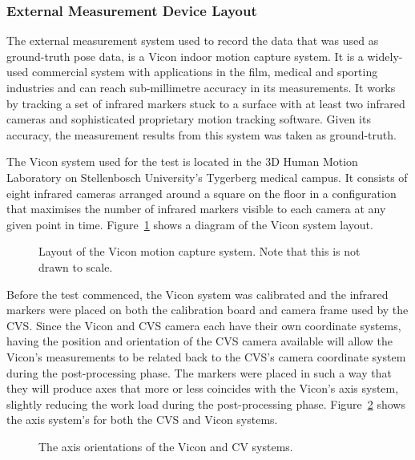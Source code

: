 \subsubsection{External Measurement Device Layout}

The external measurement system used to record the data that was used as ground-truth pose data, is a Vicon indoor motion capture system. It is a widely-used commercial system with applications in the film, medical and sporting industries and can reach sub-millimetre accuracy in its measurements. It works by tracking a set of infrared markers stuck to a surface with at least two infrared cameras and sophisticated proprietary motion tracking software. Given its accuracy, the measurement results from this system was taken as ground-truth.

The Vicon system used for the test is located in the 3D Human Motion Laboratory on Stellenbosch University's Tygerberg medical campus. It consists of eight infrared cameras arranged around a square on the floor in a configuration that maximises the number of infrared markers visible to each camera at any given point in time. Figure~\ref{fig:vicon-layout} shows a diagram of the Vicon system layout. 
 
\begin{figure}
  \centering
  \def\svgwidth{0.6\textwidth}
  
  \caption[Layout of the Vicon motion capture system.]{Layout of the Vicon motion capture system. Note that this is not drawn to scale.}
\label{fig:vicon-layout}
\end{figure}

Before the test commenced, the Vicon system was calibrated and the infrared markers were placed on both the calibration board and camera frame used by the CVS\@. Since the Vicon and CVS camera each have their own coordinate systems, having the position and orientation of the CVS camera available will allow the Vicon's measurements to be related back to the CVS's camera coordinate system during the post-processing phase. The markers were placed in such a way that they will produce axes that more or less coincides with the Vicon's axis system, slightly reducing the work load during the post-processing phase. Figure~\ref{fig:cam-vicon-axes} shows the axis system's for both the CVS and Vicon systems.

\begin{figure}
  \centering
  \def\svgwidth{0.6\textwidth}
  
  \caption{The axis orientations of the Vicon and CV systems.}
\label{fig:cam-vicon-axes}
\end{figure}

